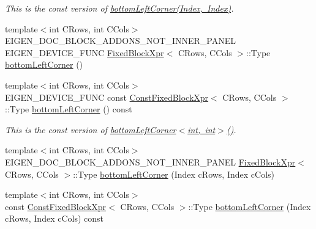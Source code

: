 \begin{DoxyCompactItemize}
\begin{DoxyCompactList}\small\item\em This is the const version of \mbox{\hyperlink{class_eigen_1_1_dense_base_a3e7f36548fb49d9e9feac8d563af4ccd}{bottom\+Left\+Corner(\+Index, Index)}}. \end{DoxyCompactList}\item 
{\footnotesize template$<$int C\+Rows, int C\+Cols$>$ }\\E\+I\+G\+E\+N\+\_\+\+D\+O\+C\+\_\+\+B\+L\+O\+C\+K\+\_\+\+A\+D\+D\+O\+N\+S\+\_\+\+N\+O\+T\+\_\+\+I\+N\+N\+E\+R\+\_\+\+P\+A\+N\+EL E\+I\+G\+E\+N\+\_\+\+D\+E\+V\+I\+C\+E\+\_\+\+F\+U\+NC \mbox{\hyperlink{struct_eigen_1_1_dense_base_1_1_fixed_block_xpr}{Fixed\+Block\+Xpr}}$<$ C\+Rows, C\+Cols $>$\+::Type \mbox{\hyperlink{class_eigen_1_1_dense_base_a35eade54f5223ddb652c2057ab26b94c}{bottom\+Left\+Corner}} ()
\item 
\mbox{\label{class_eigen_1_1_dense_base_a8594e26025b86a531561a2476400eed1}} 
{\footnotesize template$<$int C\+Rows, int C\+Cols$>$ }\\E\+I\+G\+E\+N\+\_\+\+D\+E\+V\+I\+C\+E\+\_\+\+F\+U\+NC const \mbox{\hyperlink{struct_eigen_1_1_dense_base_1_1_const_fixed_block_xpr}{Const\+Fixed\+Block\+Xpr}}$<$ C\+Rows, C\+Cols $>$\+::Type \mbox{\hyperlink{class_eigen_1_1_dense_base_a8594e26025b86a531561a2476400eed1}{bottom\+Left\+Corner}} () const
\begin{DoxyCompactList}\small\item\em This is the const version of \mbox{\hyperlink{class_eigen_1_1_dense_base_a35eade54f5223ddb652c2057ab26b94c}{bottom\+Left\+Corner$<$int, int$>$()}}. \end{DoxyCompactList}\item 
{\footnotesize template$<$int C\+Rows, int C\+Cols$>$ }\\E\+I\+G\+E\+N\+\_\+\+D\+O\+C\+\_\+\+B\+L\+O\+C\+K\+\_\+\+A\+D\+D\+O\+N\+S\+\_\+\+N\+O\+T\+\_\+\+I\+N\+N\+E\+R\+\_\+\+P\+A\+N\+EL \mbox{\hyperlink{struct_eigen_1_1_dense_base_1_1_fixed_block_xpr}{Fixed\+Block\+Xpr}}$<$ C\+Rows, C\+Cols $>$\+::Type \mbox{\hyperlink{class_eigen_1_1_dense_base_a4ce80c44ce2092f18ddecdaaac71b3d0}{bottom\+Left\+Corner}} (Index c\+Rows, Index c\+Cols)
\item 
\mbox{\label{class_eigen_1_1_dense_base_a7cf9ffde8bbc8bb29df873699518893b}} 
{\footnotesize template$<$int C\+Rows, int C\+Cols$>$ }\\const \mbox{\hyperlink{struct_eigen_1_1_dense_base_1_1_const_fixed_block_xpr}{Const\+Fixed\+Block\+Xpr}}$<$ C\+Rows, C\+Cols $>$\+::Type \mbox{\hyperlink{class_eigen_1_1_dense_base_a7cf9ffde8bbc8bb29df873699518893b}{bottom\+Left\+Corner}} (Index c\+Rows, Index c\+Cols) const

\end{DoxyCompactItemize}

